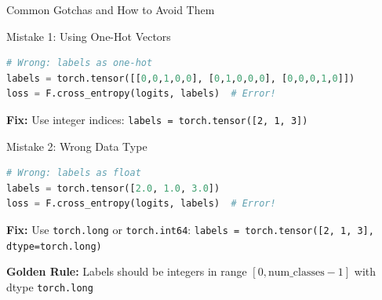 \documentclass[xcolor=svgnames, 8pt, handout, standalone]{beamer}
\newcommand{\1}{\mathbf{1}}
\begin{document}
\begin{frame}[fragile]{Common Gotchas and How to Avoid Them}
\begin{alertblock}{Mistake 1: Using One-Hot Vectors}
\begin{lstlisting}[language=Python]
# Wrong: labels as one-hot
labels = torch.tensor([[0,0,1,0,0], [0,1,0,0,0], [0,0,0,1,0]])
loss = F.cross_entropy(logits, labels)  # Error!
\end{lstlisting}
\textbf{Fix:} Use integer indices: \texttt{labels = torch.tensor([2, 1, 3])}
\end{alertblock}

\begin{alertblock}{Mistake 2: Wrong Data Type}
\begin{lstlisting}[language=Python]
# Wrong: labels as float
labels = torch.tensor([2.0, 1.0, 3.0])
loss = F.cross_entropy(logits, labels)  # Error!
\end{lstlisting}
\textbf{Fix:} Use \texttt{torch.long} or \texttt{torch.int64}: \texttt{labels = torch.tensor([2, 1, 3], dtype=torch.long)}
\end{alertblock}

\begin{tcolorbox}[colback=lightyellow, colframe=energyorange, boxrule=1pt]
\textbf{Golden Rule:} Labels should be integers in range $[0, \text{num\_classes}-1]$ with dtype \texttt{torch.long}
\end{tcolorbox}
\end{frame}
\end{document}
